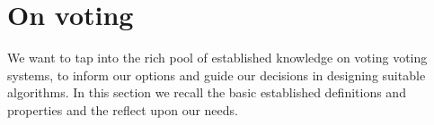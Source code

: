 
\section{On voting}
We want to tap into the rich pool of established knowledge on voting voting systems, to inform our options and guide our decisions in designing suitable algorithms. 
In this section we recall the basic established definitions and properties and the reflect upon our needs.

{\color{blue}{
\begin{verbatim}[fontsize=\small]

3) We're first going to give an overview of 
	* properties of voting systems (viewed on their own)
	* (differentiation between) popular existing voting systems. 
	
\end{verbatim}[fontsize=\small]
}}